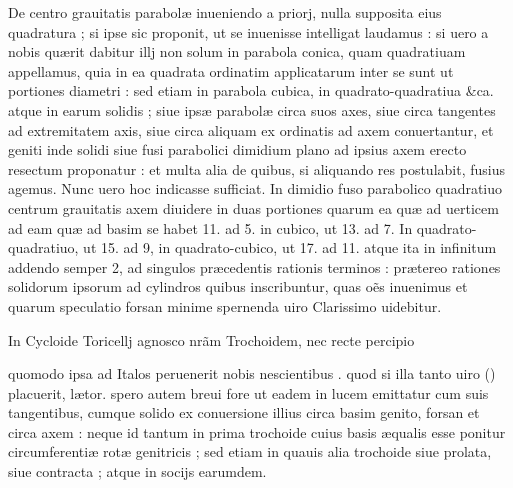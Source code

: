 \documentclass[11pt,a4paper]{article}
\begin{document}
 De centro grauitatis parabolæ inueniendo a priorj, nulla supposita eius quadratura ; si ipse sic proponit, ut se inuenisse intelligat laudamus : si uero a nobis quærit dabitur illj non solum in parabola conica, quam quadratiuam appellamus, quia in ea quadrata ordinatim applicatarum inter se sunt ut portiones diametri : sed etiam in parabola cubica, in quadrato-quadratiua \&ca. atque in earum solidis ; siue ipsæ parabolæ circa suos axes, siue circa tangentes ad extremitatem axis, siue circa aliquam ex ordinatis ad axem conuertantur, et geniti inde solidi siue fusi parabolici dimidium plano ad ipsius axem erecto resectum proponatur : et multa alia de quibus, si aliquando res postulabit, fusius agemus. Nunc uero hoc indicasse sufficiat. In dimidio fuso parabolico quadratiuo centrum grauitatis axem diuidere in duas portiones quarum ea quæ ad uerticem ad eam quæ ad basim se habet  11. ad 5. in cubico, ut 13. ad 7. In quadrato-quadratiuo, ut 15. ad 9, in quadrato-cubico, ut 17. ad 11. atque ita in infinitum addendo semper 2, ad singulos præcedentis rationis terminos : prætereo rationes solidorum ipsorum ad cylindros quibus inscribuntur, quas oẽs inuenimus et quarum speculatio forsan minime spernenda uiro Clarissimo uidebitur.

 In Cycloide Toricellj agnosco nrãm Trochoidem, nec recte percipio


quomodo ipsa ad Italos peruenerit nobis nescientibus . quod si illa tanto uiro () placuerit, lætor. spero autem breui fore ut eadem in lucem emittatur cum suis tangentibus, cumque solido ex conuersione illius circa basim genito, forsan et circa axem : neque id tantum in prima trochoide cuius basis æqualis esse ponitur circumferentiæ rotæ genitricis ; sed etiam in quauis alia trochoide siue prolata, siue contracta ; atque in socijs earumdem.
\end{document}
